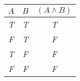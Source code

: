 
\begin{center}
\begin{tabular}{c c||c}
 $A$  & $B$ & $(A \land B)$\\
\hline
\emph{T} & \emph{T} & \emph{T} \\
\emph{F} & \emph{T} & \emph{F} \\
\emph{T} & \emph{F} & \emph{F}  \\
\emph{F} & \emph{F} & \emph{F} \\
\end{tabular}
\end{center}

